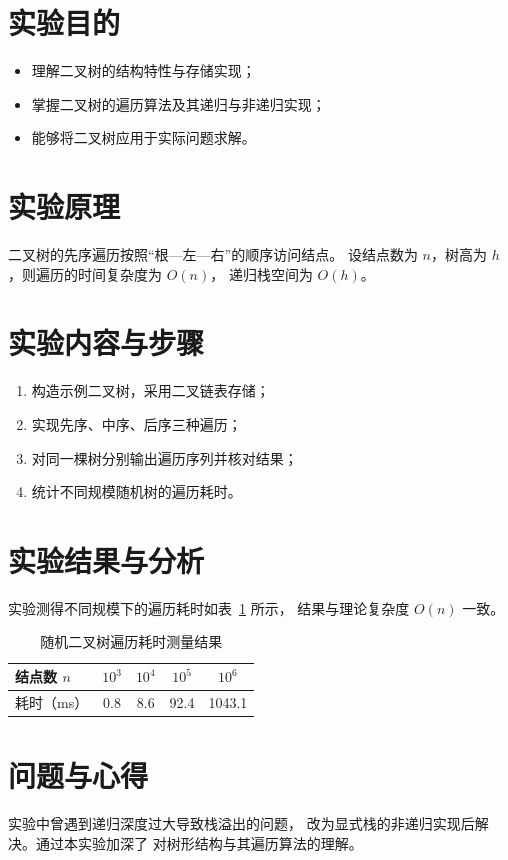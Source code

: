 \documentclass[
  UTF8,
  fontset=fandol,        %
  zihao=-4,              %
  a4paper,
]{ctexart}
\begin{document}

\section{实验目的}
\begin{itemize}
  \item 理解二叉树的结构特性与存储实现；
  \item 掌握二叉树的遍历算法及其递归与非递归实现；
  \item 能够将二叉树应用于实际问题求解。
\end{itemize}

\section{实验原理}
二叉树的先序遍历按照``根—左—右''的顺序访问结点。
设结点数为 $n$，树高为 $h$，则遍历的时间复杂度为 $O(n)$，
递归栈空间为 $O(h)$。

\section{实验内容与步骤}
\begin{enumerate}
  \item 构造示例二叉树，采用二叉链表存储；
  \item 实现先序、中序、后序三种遍历；
  \item 对同一棵树分别输出遍历序列并核对结果；
  \item 统计不同规模随机树的遍历耗时。
\end{enumerate}

\section{实验结果与分析}
实验测得不同规模下的遍历耗时如表~\ref{tab:time} 所示，
结果与理论复杂度 $O(n)$ 一致。

\begin{table}[!htbp]
  \centering
  \caption{随机二叉树遍历耗时测量结果}
  \label{tab:time}
  \begin{tabular}{lcccc}
    \toprule
    结点数 $n$ & $10^3$ & $10^4$ & $10^5$ & $10^6$ \\
    \midrule
    耗时（ms） & 0.8 & 8.6 & 92.4 & 1043.1 \\
    \bottomrule
  \end{tabular}
\end{table}


\section{问题与心得}
实验中曾遇到递归深度过大导致栈溢出的问题，
改为显式栈的非递归实现后解决。通过本实验加深了
对树形结构与其遍历算法的理解。
\end{document}
